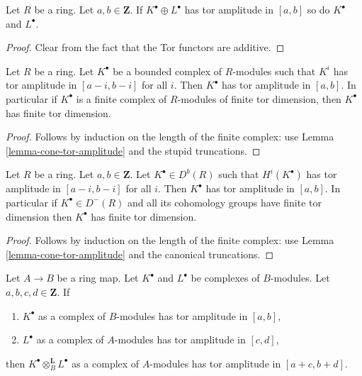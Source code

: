 \begin{lemma}
\label{lemma-summands-tor-amplitude}
Let $R$ be a ring. Let $a, b \in \mathbf{Z}$.
If $K^\bullet \oplus L^\bullet$ has tor amplitude in $[a, b]$
so do $K^\bullet$ and $L^\bullet$.
\end{lemma}

\begin{proof}
Clear from the fact that the Tor functors are additive.
\end{proof}

\begin{lemma}
\label{lemma-complex-finite-tor-dimension-modules}
Let $R$ be a ring. Let $K^\bullet$ be a bounded complex of $R$-modules
such that $K^i$ has tor amplitude in $[a - i, b - i]$ for all $i$.
Then $K^\bullet$ has tor amplitude in $[a, b]$. In particular
if $K^\bullet$ is a finite complex of $R$-modules of finite tor dimension,
then $K^\bullet$ has finite tor dimension.
\end{lemma}

\begin{proof}
Follows by induction on the length of the finite complex: use
Lemma \ref{lemma-cone-tor-amplitude}
and the stupid truncations.
\end{proof}

\begin{lemma}
\label{lemma-cohomology-tor-amplitude}
Let $R$ be a ring. Let $a, b \in \mathbf{Z}$. Let $K^\bullet \in D^b(R)$
such that $H^i(K^\bullet)$ has tor amplitude in $[a - i, b - i]$
for all $i$. Then $K^\bullet$ has tor amplitude in $[a, b]$. In particular
if $K^\bullet \in D^{-}(R)$ and all its cohomology groups have finite tor
dimension then $K^\bullet$ has finite tor dimension.
\end{lemma}

\begin{proof}
Follows by induction on the length of the finite complex: use
Lemma \ref{lemma-cone-tor-amplitude}
and the canonical truncations.
\end{proof}

\begin{lemma}
\label{lemma-push-tor-amplitude}
Let $A \to B$ be a ring map. Let $K^\bullet$ and $L^\bullet$ be complexes
of $B$-modules. Let $a, b, c, d \in \mathbf{Z}$. If
\begin{enumerate}
\item $K^\bullet$ as a complex of $B$-modules has tor amplitude in $[a, b]$,
\item $L^\bullet$ as a complex of $A$-modules has tor amplitude in $[c, d]$,
\end{enumerate}
then $K^\bullet \otimes^\mathbf{L}_B L^\bullet$ as a complex of $A$-modules
has tor amplitude in $[a + c, b + d]$.
\end{lemma}


